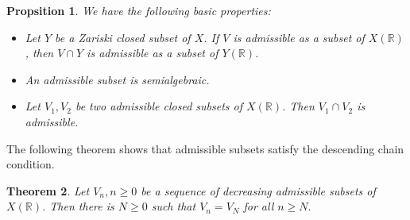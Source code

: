 \documentclass[12pt]{amsart}
\theoremstyle{plain}
\newtheorem{Thm}{Theorem}[section]
\newtheorem{Prop}[Thm]{Propsition}
\theoremstyle{remark}
\theoremstyle{definition}
\def\A{\mathbb A}
\def\R{\mathbb R}
\def\C{\mathbb C}
\def\la{\lambda}
\def\La{\Lambda}
\begin{document}
\begin{Prop}\label{propadbasic}\cite[Remarks 8.14, 8.15 and Proposition 8.16]{Ji2023} We have the following basic properties:
\begin{itemize}
\item[(1)] Let $Y$ be a Zariski closed subset of $X$.
If $V$ is admissible as a subset of $X(\R)$, then $V\cap Y$ is admissible as a subset of $Y(\R)$.

\item[(2)] An admissible subset is semialgebraic. 
\item[(3)] Let $V_1,V_2$ be two  admissible closed subsets of $X(\R)$. Then $V_1\cap V_2$ is admissible.
\end{itemize}
\end{Prop}





The following theorem shows that admissible subsets satisfy the descending chain condition.
\begin{Thm}\label{thmNoetherianad}\cite[Theorem 8.17]{Ji2023} Let $V_n, n\geq 0$ be a sequence of decreasing admissible subsets of $X(\R)$. Then there is $N\geq 0$ such that $V_n=V_N$ for all $n\geq N.$
\end{Thm}

%
%
%
%
%
%
%
%
\end{document}
